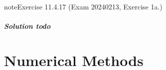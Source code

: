 \documentclass[letterpaper,10pt,english]{jupyterBook}
\begin{document}
\begin{sphinxadmonition}{note}{Exercise 11.4.17 (Exam 2024\sphinxhyphen{}02\sphinxhyphen{}13, Exercise 1a.)}



\begin{figure}[htbp]
\centering

\noindent{}
\end{figure}
\subsubsection*{Solution \sphinxhyphen{} todo}
\end{sphinxadmonition}

\sphinxstepscope


\part{Numerical Methods}

\sphinxstepscope
\end{document}
